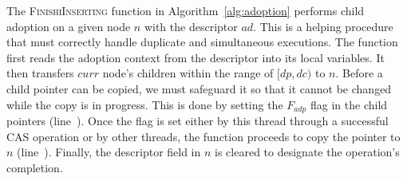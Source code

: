 \documentclass[10pt,journal,letterpaper,compsoc]{IEEEtran}
\begin{document}
The \textsc{FinishiInserting} function in Algorithm~\ref{alg:adoption} performs child adoption on a given node $n$ with the descriptor $ad$.
This is a helping procedure that must correctly handle duplicate and simultaneous executions.
The function first reads the adoption context from the descriptor into its local variables.
It then transfers $curr$ node's children within the range of $[dp, dc)$ to $n$.
Before a child pointer can be copied, we must safeguard it so that it cannot be changed while the copy is in progress.
This is done by setting the $F_{adp}$ flag in the child pointers (line~).
Once the flag is set either by this thread through a successful CAS operation or by other threads, the function proceeds to copy the pointer to $n$ (line~). 
Finally, the descriptor field in $n$ is cleared to designate the operation's completion.


\end{document}
